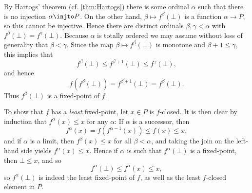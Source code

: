 \begin{proofof}
    By Hartogs' theorem (cf. \cref{thm:Hartogs}) there is some ordinal $\alpha$ such that there is no injection $\alpha \injto P$. On the other hand, $\beta \mapsto f^\beta(\bot)$ is a function $\alpha \to P$, so this cannot be injective. Hence there are distinct ordinals $\beta,\gamma < \alpha$ with $f^\beta(\bot) = f^\gamma(\bot)$. Because $\alpha$ is totally ordered we may assume without loss of generality that $\beta < \gamma$. Since the map $\beta \mapsto f^\beta(\bot)$ is monotone and $\beta + 1 \leq \gamma$, this implies that
    \begin{equation*}
        f^\beta(\bot)
            \leq f^{\beta+1}(\bot)
            \leq f^\gamma(\bot),
    \end{equation*}
    and hence
    \begin{equation*}
        f(f^\beta(\bot))
            = f^{\beta+1}(\bot)
            = f^\beta(\bot).
    \end{equation*}
    Thus $f^\beta(\bot)$ is a fixed-point of $f$.

    To show that $f$ has a \emph{least} fixed-point, let $x \in P$ is $f$-closed. It is then clear by induction that $f^\alpha(x) \leq x$ for any $\alpha$: If $\alpha$ is a successor, then
    \begin{equation*}
        f^\alpha(x)
            = f(f^{\alpha-1}(x))
            \leq f(x)
            \leq x,
    \end{equation*}
    and if $\alpha$ is a limit, then $f^\beta(x) \leq x$ for all $\beta < \alpha$, and taking the join on the left-hand side yields $f^\alpha(x) \leq x$. Hence if $\alpha$ is such that $f^\alpha(\bot)$ is a fixed-point, then $\bot \leq x$, and so
    \begin{equation*}
        f^\alpha(\bot)
            \leq f^\alpha(x)
            \leq x,
    \end{equation*}
    so $f^\alpha(\bot)$ is indeed the least fixed-point of $f$, as well as the least $f$-closed element in $P$.
\end{proofof}





